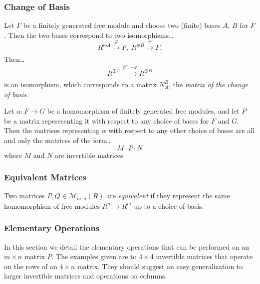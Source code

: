 \subsubsection{Change of Basis}\label{changeofbasis}
Let $F$ be a finitely generated free module and choose two (finite) bases $A$, $B$ for $F$. Then the two bases correspond
to two isomorphisms\dots
$$R^{\oplus A} \xrightarrow[]{\varphi} F, \; R^{\oplus B} \xrightarrow[]{\psi} F.$$
Then\dots
$$R^{\oplus A} \xrightarrow[]{\psi^{-1} \circ \varphi} R^{\oplus B}$$
is an isomorphism, which corresponds to a matrix $N^B_A$, the \emph{matrix of the change of basis}.

\begin{proposition}
Let $\alpha : F \rightarrow G$ be a homomorphism of finitely generated free modules, and let $P$ be a matrix reperesenting
it with respect to any choice of bases for $F$ and $G$. Then the matrices representing $\alpha$ with respect to any other
choice of bases are all and only the matrices of the form\dots
$$M \cdot P \cdot N$$
where $M$ and $N$ are invertible matrices.

\subsubsection{Equivalent Matrices}\label{equivalentmatrices}
Two matrices $P, Q \in \mathcal{M}_{m,n}(R)$ are \emph{equivalent} if they represent the same homomorphism of free modules
$R^n \rightarrow R^m$ up to a choice of basis.
\end{proposition}

\subsubsection{Elementary Operations}
In this section we detail the elementary operations that can be performed on an $m \times n$ matrix $P$. The examples given are
to $4 \times 4$ invertible matrices that operate on the rows of an $4 \times n$ matrix. They should suggest an easy generalization to
larger invertible matrices and operations on columns.\newline

